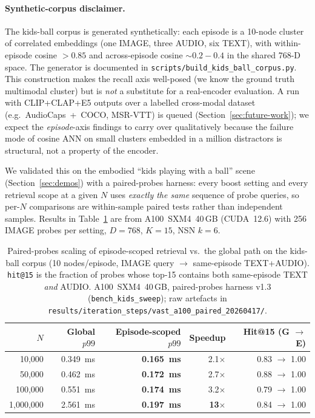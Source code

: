 \documentclass[11pt]{article}
\begin{document}
\paragraph{Synthetic-corpus disclaimer.} The kids-ball corpus is
generated synthetically: each episode is a 10-node cluster of
correlated embeddings (one IMAGE, three AUDIO, six TEXT), with
within-episode cosine $> 0.85$ and across-episode cosine
$\sim 0.2{-}0.4$ in the shared 768-D space. The generator is
documented in \texttt{scripts/build\_kids\_ball\_corpus.py}. This
construction makes the recall axis well-posed (we know the ground
truth multimodal cluster) but is \emph{not} a substitute for a
real-encoder evaluation. A run with CLIP+CLAP+E5 outputs over a
labelled cross-modal dataset (e.g.\ AudioCaps~+~COCO,
MSR-VTT) is queued (Section~\ref{sec:future-work}); we expect the
\emph{episode}-axis findings to carry over qualitatively because
the failure mode of cosine ANN on small clusters embedded in a
million distractors is structural, not a property of the encoder.

We validated this on the embodied ``kids playing with a ball'' scene
(Section~\ref{sec:demos}) with a paired-probes harness: every
boost setting and every retrieval scope at a given $N$ uses
\emph{exactly the same} sequence of probe queries, so per-$N$
comparisons are within-sample paired tests rather than independent
samples. Results in Table~\ref{tab:episode_scoped_scaling} are from
A100~SXM4~40\,GB (CUDA~12.6) with 256 IMAGE probes per setting,
$D{=}768$, $K{=}15$, NSN $k{=}6$.

\begin{table}[ht]
\centering
\small
\caption{Paired-probes scaling of episode-scoped retrieval vs.\ the
global path on the kids-ball corpus (10 nodes/episode, IMAGE query
$\to$ same-episode TEXT+AUDIO). \texttt{hit@15} is the fraction of
probes whose top-15 contains both same-episode TEXT \emph{and} AUDIO.
A100~SXM4~40\,GB, paired-probes harness v1.3
(\texttt{bench\_kids\_sweep}); raw artefacts in
\texttt{results/iteration\_steps/vast\_a100\_paired\_20260417/}.}
\label{tab:episode_scoped_scaling}
\begin{tabular}{rrrrr}
\toprule
\textbf{$N$} & \textbf{Global $p99$} & \textbf{Episode-scoped $p99$} & \textbf{Speedup} & \textbf{Hit@15 (G $\to$ E)} \\
\midrule
   10{,}000 & 0.349~ms & \textbf{0.165~ms} &  2.1$\times$ & 0.83 $\to$ 1.00 \\
   50{,}000 & 0.462~ms & \textbf{0.172~ms} &  2.7$\times$ & 0.88 $\to$ 1.00 \\
  100{,}000 & 0.551~ms & \textbf{0.174~ms} &  3.2$\times$ & 0.79 $\to$ 1.00 \\
1{,}000{,}000 & 2.561~ms & \textbf{0.197~ms} & \textbf{13$\times$} & 0.84 $\to$ 1.00 \\
\bottomrule
\end{tabular}
\end{table}
\end{document}
